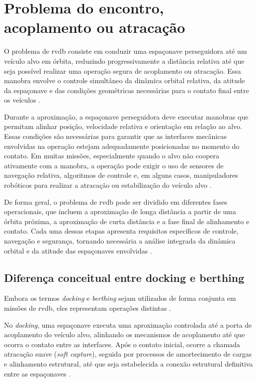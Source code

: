 \section{Problema do encontro, acoplamento ou atracação}

O problema de \gls{rvdb} consiste em conduzir uma espaçonave perseguidora até um veículo alvo em órbita, reduzindo progressivamente a distância relativa até que seja possível realizar uma operação segura de acoplamento ou atracação.
Essa manobra envolve o controle simultâneo da dinâmica orbital relativa, da atitude da espaçonave e das condições geométricas necessárias para o contato final entre os veículos \cite{curtis2013orbital}.

Durante a aproximação, a espaçonave perseguidora deve executar manobras que permitam alinhar posição, velocidade relativa e orientação em relação ao alvo. 
Essas condições são necessárias para garantir que as interfaces mecânicas envolvidas na operação estejam adequadamente posicionadas no momento do contato.
Em muitas missões, especialmente quando o alvo não coopera ativamente com a manobra, a operação pode exigir o uso de sensores de navegação relativa, algoritmos de controle e, em alguns casos, manipuladores robóticos para realizar a atracação ou estabilização do veículo alvo \cite{flores2014review}.

De forma geral, o problema de \gls{rvdb} pode ser dividido em diferentes fases operacionais, que incluem a aproximação de longa distância a partir de uma órbita próxima, a aproximação de curta distância e a fase final de alinhamento e contato. Cada uma dessas etapas apresenta requisitos específicos de controle, navegação e segurança, tornando necessária a análise integrada da dinâmica orbital e da atitude das espaçonaves envolvidas \cite{fehse2003}.


\subsection{Diferença conceitual entre docking e berthing}

Embora os termos \textit{docking} e \textit{berthing} sejam utilizados de forma conjunta em missões de \gls{rvdb}, eles representam operações distintas \cite{cook2011}.

No \textit{docking}, uma espaçonave executa uma aproximação controlada até a porta de acoplamento do veículo alvo, alinhando os mecanismos de acoplamento até que ocorra o contato entre as interfaces. Após o contato inicial, ocorre a chamada atracação suave (\textit{soft capture}), seguida por processos de amortecimento de cargas e alinhamento estrutural, até que seja estabelecida a conexão estrutural definitiva entre as espaçonaves \cite{cook2011}.

